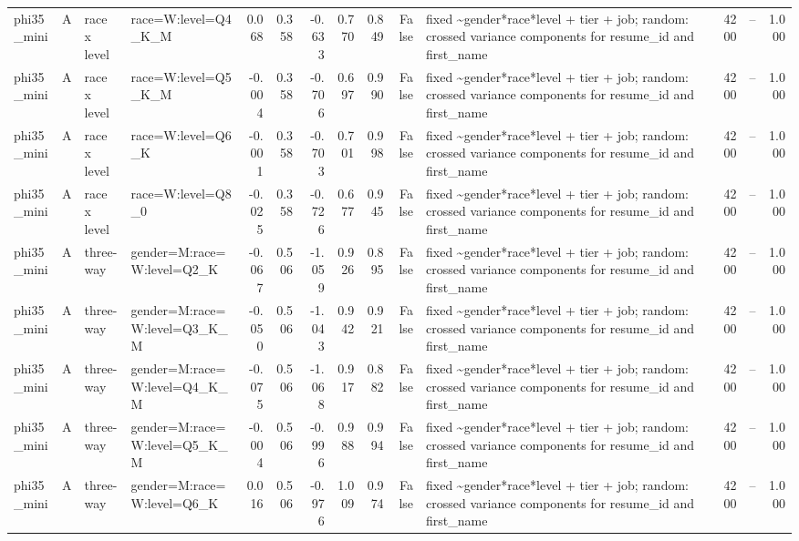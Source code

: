\begin{tabular}{llllrrrrrrlrlr}
phi35\_mini & A & race x level & race=W:level=Q4\_K\_M & 0.068 & 0.358 & -0.633 & 0.770 & 0.849 & False & fixed \textasciitilde \space gender*race*level + tier + job; random: crossed variance components for resume\_id and first\_name & 4200 & -- & 1.000 \\
phi35\_mini & A & race x level & race=W:level=Q5\_K\_M & -0.004 & 0.358 & -0.706 & 0.697 & 0.990 & False & fixed \textasciitilde \space gender*race*level + tier + job; random: crossed variance components for resume\_id and first\_name & 4200 & -- & 1.000 \\
phi35\_mini & A & race x level & race=W:level=Q6\_K & -0.001 & 0.358 & -0.703 & 0.701 & 0.998 & False & fixed \textasciitilde \space gender*race*level + tier + job; random: crossed variance components for resume\_id and first\_name & 4200 & -- & 1.000 \\
phi35\_mini & A & race x level & race=W:level=Q8\_0 & -0.025 & 0.358 & -0.726 & 0.677 & 0.945 & False & fixed \textasciitilde \space gender*race*level + tier + job; random: crossed variance components for resume\_id and first\_name & 4200 & -- & 1.000 \\
phi35\_mini & A & three-way & gender=M:race=W:level=Q2\_K & -0.067 & 0.506 & -1.059 & 0.926 & 0.895 & False & fixed \textasciitilde \space gender*race*level + tier + job; random: crossed variance components for resume\_id and first\_name & 4200 & -- & 1.000 \\
phi35\_mini & A & three-way & gender=M:race=W:level=Q3\_K\_M & -0.050 & 0.506 & -1.043 & 0.942 & 0.921 & False & fixed \textasciitilde \space gender*race*level + tier + job; random: crossed variance components for resume\_id and first\_name & 4200 & -- & 1.000 \\
phi35\_mini & A & three-way & gender=M:race=W:level=Q4\_K\_M & -0.075 & 0.506 & -1.068 & 0.917 & 0.882 & False & fixed \textasciitilde \space gender*race*level + tier + job; random: crossed variance components for resume\_id and first\_name & 4200 & -- & 1.000 \\
phi35\_mini & A & three-way & gender=M:race=W:level=Q5\_K\_M & -0.004 & 0.506 & -0.996 & 0.988 & 0.994 & False & fixed \textasciitilde \space gender*race*level + tier + job; random: crossed variance components for resume\_id and first\_name & 4200 & -- & 1.000 \\
phi35\_mini & A & three-way & gender=M:race=W:level=Q6\_K & 0.016 & 0.506 & -0.976 & 1.009 & 0.974 & False & fixed \textasciitilde \space gender*race*level + tier + job; random: crossed variance components for resume\_id and first\_name & 4200 & -- & 1.000 \\

\end{tabular}

